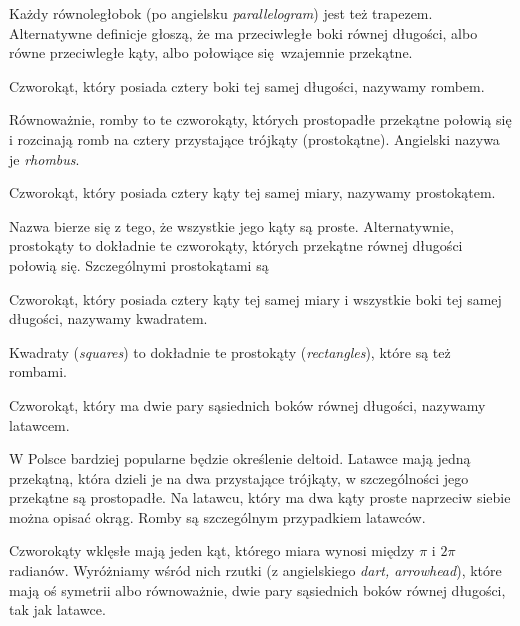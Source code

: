 Każdy równoległobok (po angielsku \emph{parallelogram}) jest też trapezem.
Alternatywne definicje głoszą, że ma przeciwległe boki równej długości, albo równe przeciwległe kąty, albo połowiące się wzajemnie przekątne.

\begin{definition}[romb]
	Czworokąt, który posiada cztery boki tej samej długości, nazywamy rombem.
\end{definition}

Równoważnie, romby to te czworokąty, których prostopadłe przekątne połowią się i rozcinają romb na cztery przystające trójkąty (prostokątne).
Angielski nazywa je \emph{rhombus}.

\begin{definition}[prostokąt]
	Czworokąt, który posiada cztery kąty tej samej miary, nazywamy prostokątem.
\end{definition}

Nazwa bierze się z tego, że wszystkie jego kąty są proste.
Alternatywnie, prostokąty to dokładnie te czworokąty, których przekątne równej długości połowią się.
Szczególnymi prostokątami są

\begin{definition}[kwadrat]
	Czworokąt, który posiada cztery kąty tej samej miary i wszystkie boki tej samej długości, nazywamy kwadratem.
\end{definition}

Kwadraty (\emph{squares}) to dokładnie te prostokąty (\emph{rectangles}), które są też rombami.

\begin{definition}[latawiec]
	Czworokąt, który ma dwie pary sąsiednich boków równej długości, nazywamy latawcem.
\end{definition}

W Polsce bardziej popularne będzie określenie deltoid.
Latawce mają jedną przekątną, która dzieli je na dwa przystające trójkąty, w szczególności jego przekątne są prostopadłe.
Na latawcu, który ma dwa kąty proste naprzeciw siebie można opisać okrąg.
Romby są szczególnym przypadkiem latawców.

Czworokąty wklęsłe mają jeden kąt, którego miara wynosi między $\pi$ i $2\pi$ radianów.
Wyróżniamy wśród nich rzutki (z angielskiego \emph{dart, arrowhead}), które mają oś symetrii albo równoważnie, dwie pary sąsiednich boków równej długości, tak jak latawce.

